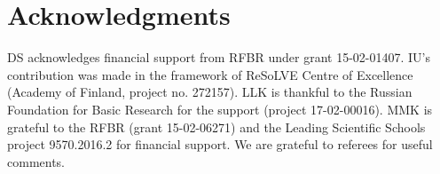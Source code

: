 \documentclass[fleqn,12pt]{SelfArx} %
\begin{document}
	




\section*{Acknowledgments}


DS acknowledges financial support from RFBR under grant 15-02-01407.
IU's contribution was made in the framework of ReSoLVE Centre of Excellence (Academy of Finland, project no. 
272157). LLK is thankful to the Russian Foundation for Basic Research for the support (project 17-02-00016).
MMK is grateful to the RFBR (grant 15-02-06271) and the Leading Scientific Schools project 9570.2016.2 for 
financial support. We are grateful to referees for useful 
comments.
\end{document}

